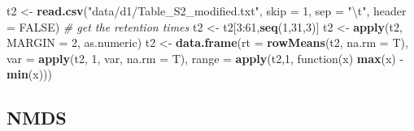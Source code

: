 \documentclass[]{article}
\newenvironment{Shaded}{}{}
\newcommand{\KeywordTok}[1]{\textbf{{#1}}}
\newcommand{\DataTypeTok}[1]{\textcolor[rgb]{0.50,0.00,0.00}{{#1}}}
\newcommand{\DecValTok}[1]{\textcolor[rgb]{0.00,0.00,1.00}{{#1}}}
\newcommand{\CharTok}[1]{\textcolor[rgb]{1.00,0.00,1.00}{{#1}}}
\newcommand{\StringTok}[1]{\textcolor[rgb]{0.87,0.00,0.00}{{#1}}}
\newcommand{\CommentTok}[1]{\textcolor[rgb]{0.50,0.50,0.50}{\textit{{#1}}}}
\newcommand{\OtherTok}[1]{{#1}}
\newcommand{\NormalTok}[1]{{#1}}
\begin{document}
\begin{Shaded}
\begin{Highlighting}[]
\NormalTok{t2 <-}\StringTok{ }\KeywordTok{read.csv}\NormalTok{(}\StringTok{"data/d1/Table_S2_modified.txt"}\NormalTok{, }\DataTypeTok{skip =} \DecValTok{1}\NormalTok{, }\DataTypeTok{sep =} \StringTok{"}\CharTok{\textbackslash{}t}\StringTok{"}\NormalTok{, }\DataTypeTok{header =} \OtherTok{FALSE}\NormalTok{)}
\CommentTok{# get the retention times}
\NormalTok{t2 <-}\StringTok{ }\NormalTok{t2[}\DecValTok{3}\NormalTok{:}\DecValTok{61}\NormalTok{,}\KeywordTok{seq}\NormalTok{(}\DecValTok{1}\NormalTok{,}\DecValTok{31}\NormalTok{,}\DecValTok{3}\NormalTok{)]}
\NormalTok{t2 <-}\StringTok{ }\KeywordTok{apply}\NormalTok{(t2, }\DataTypeTok{MARGIN =} \DecValTok{2}\NormalTok{, as.numeric)}
\NormalTok{t2 <-}\StringTok{ }\KeywordTok{data.frame}\NormalTok{(}\DataTypeTok{rt =} \KeywordTok{rowMeans}\NormalTok{(t2, }\DataTypeTok{na.rm =} \NormalTok{T), }\DataTypeTok{var =} \KeywordTok{apply}\NormalTok{(t2, }\DecValTok{1}\NormalTok{, var, }\DataTypeTok{na.rm =} \NormalTok{T), }\DataTypeTok{range =} \KeywordTok{apply}\NormalTok{(t2,}\DecValTok{1}\NormalTok{, function(x) }\KeywordTok{max}\NormalTok{(x) -}\StringTok{ }\KeywordTok{min}\NormalTok{(x))) }
\end{Highlighting}
\end{Shaded}

\subsection{NMDS}\label{nmds}
\end{document}
